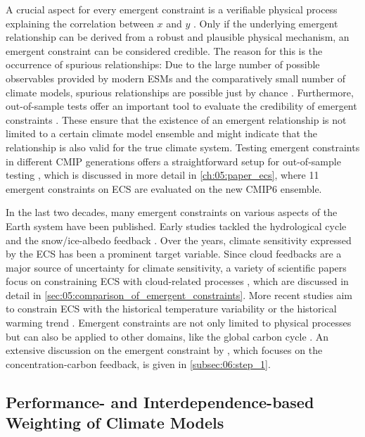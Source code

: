 A crucial aspect for every emergent constraint is a verifiable physical process
explaining the correlation between $x$ and $y$ \autocite{Hall2019}. Only if the
underlying emergent relationship can be derived from a robust and plausible
physical mechanism, an emergent constraint can be considered credible. The
reason for this is the occurrence of spurious relationships: Due to the large
number of possible observables provided by modern \acp{ESM} and the
comparatively small number of climate models, spurious relationships are
possible just by chance \autocite{Caldwell2014}. Furthermore, out-of-sample
tests offer an important tool to evaluate the credibility of emergent
constraints \autocite{Hall2019}. These ensure that the existence of an emergent
relationship is not limited to a certain climate model ensemble and might
indicate that the relationship is also valid for the true climate system.
Testing emergent constraints in different \ac{CMIP} generations offers a
straightforward setup for out-of-sample testing \autocite{Caldwell2018}, which
is discussed in more detail in \cref{ch:05:paper_ecs}, where 11 emergent
constraints on \ac{ECS} are evaluated on the new \acs{CMIP}6 ensemble.

In the last two decades, many emergent constraints on various aspects of the
Earth system have been published. Early studies tackled the hydrological cycle
\autocite{Allen2002} and the snow/ice-albedo feedback \autocite{Hall2006}. Over
the years, climate sensitivity expressed by the \ac{ECS} has been a prominent
target variable. Since cloud feedbacks are a major source of uncertainty for
climate sensitivity, a variety of scientific papers focus on constraining
\ac{ECS} with cloud-related processes \autocite{Brient2015, Brient2016,
  Fasullo2012, Lipat2017, Sherwood2014, Su2014, Tian2015, Volodin2008, Qu2013,
  Zhai2015}, which are discussed in detail in
\cref{sec:05:comparison_of_emergent_constraints}. More recent studies aim to
constrain \ac{ECS} with the historical temperature variability
\autocite{Cox2018} or the historical warming trend
\autocite{JimenezdelaCuesta2019, Nijsse2020, Tokarska2020}. Emergent
constraints are not only limited to physical processes but can also be applied
to other domains, like the global carbon cycle \autocite{Cox2013,
  Kwiatkowski2017, Wenzel2014, Wenzel2016, Winkler2019}. An extensive
discussion on the emergent constraint by \textcite{Wenzel2016}, which focuses
on the concentration-carbon feedback, is given in \cref{subsec:06:step_1}.


\subsection{Performance- and Interdependence-based Weighting of Climate Models}
\label{subsec:02:model_weighting}

